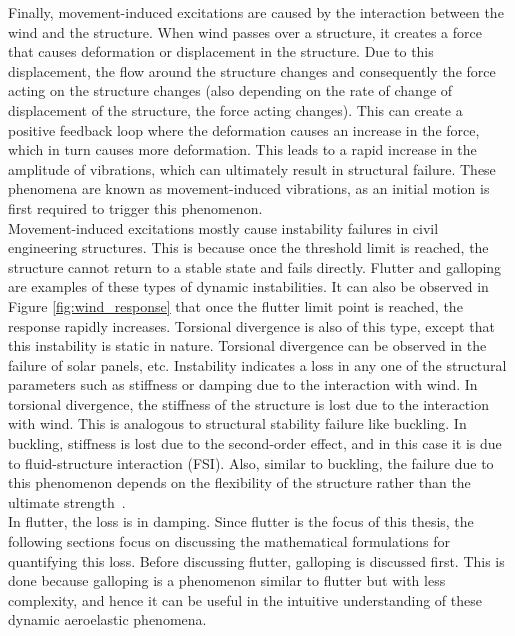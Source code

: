 \documentclass[../main]{subfiles}
\begin{document}
Finally, movement-induced excitations are caused by the interaction between the wind and the structure. When wind passes over a structure, 
it creates a force that causes deformation or displacement in the structure. Due to this displacement, 
the flow around the structure changes and consequently the force acting on the structure changes (also depending on the rate of change of displacement 
of the structure, the force acting changes). This can create a positive feedback loop where the 
deformation causes an increase in the force, which in turn causes more deformation. This leads to a rapid increase in the amplitude of vibrations, which can 
ultimately result in structural failure. These phenomena are known as movement-induced vibrations, as an initial motion is first required to trigger this phenomenon. \\

Movement-induced excitations mostly cause instability failures in civil engineering structures. This is 
because once the threshold limit is reached, the structure cannot return to a stable state and fails directly. 
Flutter and galloping are examples of these types of dynamic instabilities. 
It can also be observed in Figure \ref{fig:wind_response} that once the flutter limit point is reached, the response rapidly increases. 
Torsional divergence is also of this type, except 
that this instability is static in nature. Torsional divergence can be observed in the failure of solar panels, etc. 
Instability indicates a loss in any one of the structural parameters such as stiffness or damping due to the interaction with wind. In torsional
divergence, the stiffness of the structure is lost due to the interaction with wind. This is analogous to structural stability failure like buckling. 
In buckling, stiffness is lost due to the second-order effect, and in this case it is due to fluid-structure interaction (FSI). Also, similar to buckling, the failure due to
this phenomenon depends on the flexibility of the structure rather than the ultimate strength~\cite{SimiuScanlan1996}. \\

In flutter, the loss is in damping. Since flutter is the focus of this thesis, the following sections focus on discussing the mathematical formulations for quantifying this loss.
Before discussing flutter, galloping is discussed first. This is done because galloping is a phenomenon similar to flutter but with less complexity, 
and hence it can be useful in the intuitive understanding of these dynamic aeroelastic phenomena. \\
\end{document}
